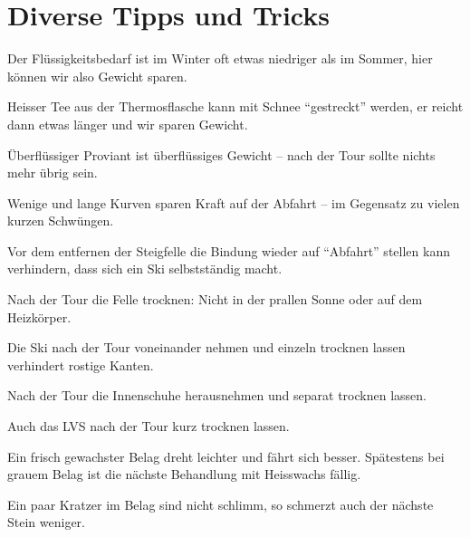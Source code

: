\section{Diverse Tipps und Tricks}

Der Flüssigkeitsbedarf ist im Winter oft etwas niedriger als im Sommer, hier können wir also Gewicht sparen.

Heisser Tee aus der Thermosflasche kann mit Schnee \enquote{gestreckt} werden, er reicht dann etwas länger und wir sparen Gewicht.

Überflüssiger Proviant ist überflüssiges Gewicht -- nach der Tour sollte nichts mehr übrig sein.

Wenige und lange Kurven sparen Kraft auf der Abfahrt -- im Gegensatz zu vielen kurzen Schwüngen.

Vor dem entfernen der Steigfelle die Bindung wieder auf \enquote{Abfahrt} stellen kann verhindern, dass sich ein Ski selbstständig macht.

Nach der Tour die Felle trocknen: Nicht in der prallen Sonne oder auf dem Heizkörper.

Die Ski nach der Tour voneinander nehmen und einzeln trocknen lassen verhindert rostige Kanten.

Nach der Tour die Innenschuhe herausnehmen und separat trocknen lassen.

Auch das LVS nach der Tour kurz trocknen lassen.

Ein frisch gewachster Belag dreht leichter und fährt sich besser.
Spätestens bei grauem Belag ist die nächste Behandlung mit Heisswachs fällig.

Ein paar Kratzer im Belag sind nicht schlimm, so schmerzt auch der nächste Stein weniger.

\prntlen{\linewidth}
\prntlen{\textwidth}
\prntlen{\columnwidth}
\prntlen{\columnsep}